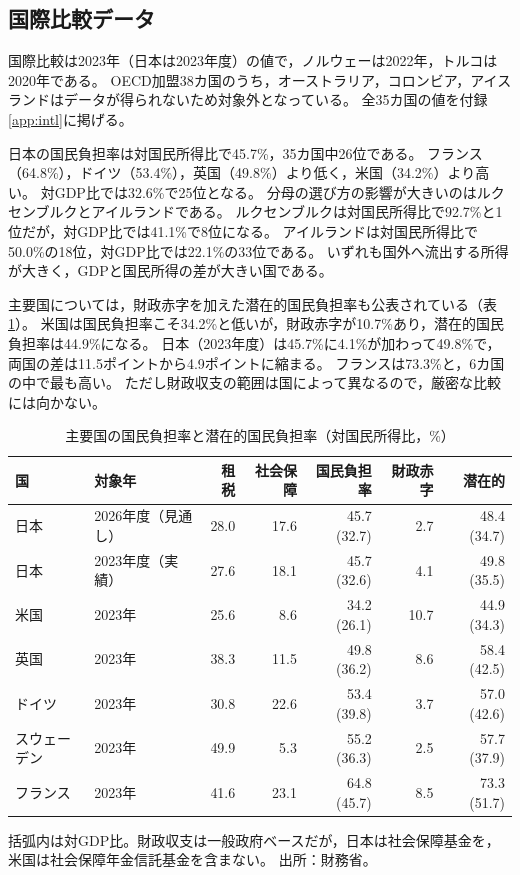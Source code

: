 \documentclass[paper=a4,fontsize=10pt]{jlreq}
\begin{document}
\subsection{国際比較データ}

国際比較は2023年（日本は2023年度）の値で，ノルウェーは2022年，トルコは2020年である。
OECD加盟38カ国のうち，オーストラリア，コロンビア，アイスランドはデータが得られないため対象外となっている。
全35カ国の値を付録\ref{app:intl}に掲げる。

日本の国民負担率は対国民所得比で45.7\%，35カ国中26位である。
フランス（64.8\%），ドイツ（53.4\%），英国（49.8\%）より低く，米国（34.2\%）より高い。
対GDP比では32.6\%で25位となる。
分母の選び方の影響が大きいのはルクセンブルクとアイルランドである。
ルクセンブルクは対国民所得比で92.7\%と1位だが，対GDP比では41.1\%で8位になる。
アイルランドは対国民所得比で50.0\%の18位，対GDP比では22.1\%の33位である。
いずれも国外へ流出する所得が大きく，GDPと国民所得の差が大きい国である。

主要国については，財政赤字を加えた潜在的国民負担率も公表されている（表\ref{tab:major}）。
米国は国民負担率こそ34.2\%と低いが，財政赤字が10.7\%あり，潜在的国民負担率は44.9\%になる。
日本（2023年度）は45.7\%に4.1\%が加わって49.8\%で，両国の差は11.5ポイントから4.9ポイントに縮まる。
フランスは73.3\%と，6カ国の中で最も高い。
ただし財政収支の範囲は国によって異なるので，厳密な比較には向かない。

\begin{table}[htbp]
  \centering
  \caption{主要国の国民負担率と潜在的国民負担率（対国民所得比，\%）}\label{tab:major}
  \begin{tabular}{llrrrrr}
    \toprule
    国 & 対象年 & 租税 & 社会保障 & 国民負担率 & 財政赤字 & 潜在的 \\
    \midrule
    日本 & 2026年度（見通し） & 28.0 & 17.6 & 45.7 (32.7) & 2.7 & 48.4 (34.7) \\
    日本 & 2023年度（実績） & 27.6 & 18.1 & 45.7 (32.6) & 4.1 & 49.8 (35.5) \\
    米国 & 2023年 & 25.6 & 8.6 & 34.2 (26.1) & 10.7 & 44.9 (34.3) \\
    英国 & 2023年 & 38.3 & 11.5 & 49.8 (36.2) & 8.6 & 58.4 (42.5) \\
    ドイツ & 2023年 & 30.8 & 22.6 & 53.4 (39.8) & 3.7 & 57.0 (42.6) \\
    スウェーデン & 2023年 & 49.9 & 5.3 & 55.2 (36.3) & 2.5 & 57.7 (37.9) \\
    フランス & 2023年 & 41.6 & 23.1 & 64.8 (45.7) & 8.5 & 73.3 (51.7) \\
    \bottomrule
  \end{tabular}

  \smallskip
  {\footnotesize 括弧内は対GDP比。財政収支は一般政府ベースだが，日本は社会保障基金を，米国は社会保障年金信託基金を含まない。
  出所：財務省\cite{mof2026}。}
\end{table}
\end{document}
